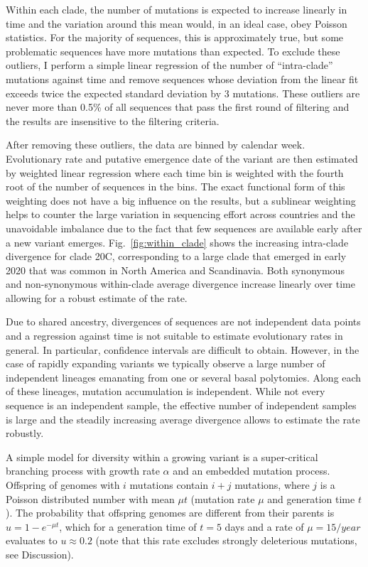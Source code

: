 \documentclass[aps,rmp, twocolumn]{revtex4}
\begin{document}
Within each clade, the number of mutations is expected to increase linearly in time and the variation around this mean would, in an ideal case, obey Poisson statistics.
For the majority of sequences, this is approximately true, but some problematic sequences have more mutations than expected.
To exclude these outliers, I perform a simple linear regression of the number of ``intra-clade'' mutations against time and remove sequences whose deviation from the linear fit exceeds twice the expected standard deviation by 3 mutations. These outliers are never more than 0.5\% of all sequences that pass the first round of filtering and the results are insensitive to the filtering criteria.


After removing these outliers, the data are binned by calendar week.
Evolutionary rate and putative emergence date of the variant are then estimated by weighted linear regression where each time bin is weighted with the fourth root of the number of sequences in the bins.
The exact functional form of this weighting does not have a big influence on the results, but a sublinear weighting helps to counter the large variation in sequencing effort across countries and the unavoidable imbalance due to the fact that few sequences are available early after a new variant emerges.
Fig.~\ref{fig:within_clade} shows the increasing intra-clade divergence for clade 20C, corresponding to a large clade that emerged in early 2020 that was common in North America and Scandinavia.
Both synonymous and non-synonymous within-clade average divergence increase linearly over time allowing for a robust estimate of the rate.

Due to shared ancestry, divergences of sequences are not independent data points and a regression against time is not suitable to estimate evolutionary rates in general.
In particular, confidence intervals are difficult to obtain.
However, in the case of rapidly expanding variants we typically observe a large number of independent lineages emanating from one or several basal polytomies.
Along each of these lineages, mutation accumulation is independent.
While not every sequence is an independent sample, the effective number of independent samples is large and the steadily increasing average divergence allows to estimate the rate robustly.

A simple model for diversity within a growing variant is a super-critical branching process with growth rate $\alpha$ and an embedded mutation process.
Offspring of genomes with $i$ mutations contain $i+j$ mutations, where $j$ is a Poisson distributed number with mean $\mu t$ (mutation rate $\mu$ and generation time $t$).
The probability that offspring genomes are different from their parents is $u = 1-e^{-\mu t}$, which for a generation time of $t=5$ days and a rate of $\mu = 15/year$ evaluates to $u\approx 0.2$ (note that this rate excludes strongly deleterious mutations, see Discussion).
\end{document}
